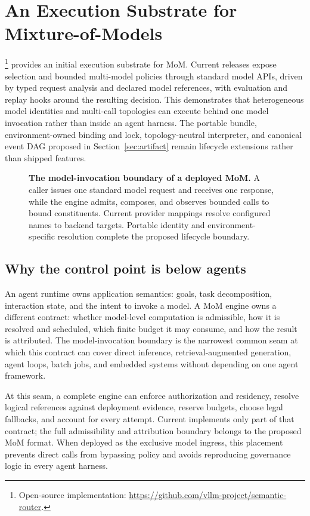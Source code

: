 \section{An Execution Substrate for Mixture-of-Models}
\label{sec:reference-engine}

\vsr{}\footnote{Open-source implementation:
\url{https://github.com/vllm-project/semantic-router}.} provides an initial
execution substrate for MoM. Current releases expose selection and bounded
multi-model policies through standard model APIs, driven by typed request
analysis and declared model references, with evaluation and replay hooks around
the resulting decision. This demonstrates that heterogeneous model identities
and multi-call topologies can execute behind one model invocation rather than
inside an agent harness. The portable bundle, environment-owned binding and
lock, topology-neutral interpreter, and canonical event DAG proposed in
Section~\ref{sec:artifact} remain lifecycle extensions rather than shipped
features.

\begin{figure}[htbp]
  \centering
  \resizebox{0.98\linewidth}{!}{}
  \caption{\textbf{The model-invocation boundary of a deployed MoM.} A caller
  issues one standard model request and receives one response, while the engine
  admits, composes, and observes bounded calls to bound constituents. Current
  provider mappings resolve configured names to backend targets. Portable
  identity and environment-specific resolution complete the proposed lifecycle
  boundary.}
  \label{fig:reference-engine}
\end{figure}

\subsection{Why the control point is below agents}

An agent runtime owns application semantics: goals, task decomposition,
interaction state, and the intent to invoke a model. A MoM engine owns a
different contract: whether model-level computation is admissible, how it is
resolved and scheduled, which finite budget it may consume, and how the result
is attributed. The model-invocation boundary is the narrowest common seam at
which this contract can cover direct inference, retrieval-augmented generation,
agent loops, batch jobs, and embedded systems without depending on one agent
framework.

At this seam, a complete engine can enforce authorization and residency,
resolve logical references against deployment evidence, reserve budgets, choose
legal fallbacks, and account for every attempt. Current \vsr{} implements only
part of that contract; the full admissibility and attribution boundary belongs
to the proposed MoM format. When deployed as the exclusive model ingress,
this placement prevents direct calls from bypassing policy and avoids
reproducing governance logic in every agent harness.

